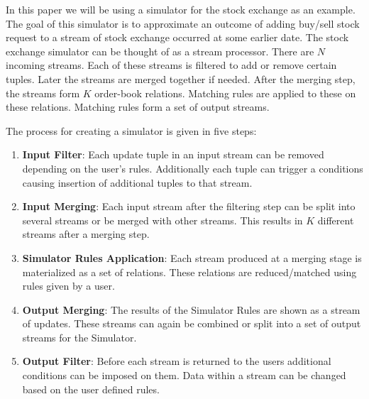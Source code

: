 \documentclass{article}
\begin{document}
In this paper we will be using a simulator for the stock exchange as an example. The goal of this simulator is to approximate an outcome of adding buy/sell stock request to a stream of stock exchange occurred at some earlier date. The stock exchange simulator can be thought of as a stream processor. There are $N$ incoming streams. Each of these streams is filtered to add or remove certain tuples. Later the streams are merged together if needed. After the merging step, the streams form $K$ order-book relations. Matching rules are applied to these on these relations. Matching rules form a set of output streams.

The process for creating a simulator is given in five steps:

\begin{enumerate}
    \item {\bf Input Filter}: Each update tuple in an input stream can be removed depending on the user's rules. Additionally each tuple can trigger a conditions causing insertion of additional tuples to that stream.  
    \item {\bf Input Merging}: Each input stream after the filtering step can be split into several streams or be merged with other streams. This results in $K$ different streams after a merging step.
    \item {\bf Simulator Rules Application}: Each stream produced at a merging stage is materialized as a set of relations. These relations are reduced/matched using rules given by a user.
    \item {\bf Output Merging}: The results of the Simulator Rules are shown as a stream of updates. These streams can again be combined or split into a set of output streams for the Simulator. 
    \item {\bf Output Filter}: Before each stream is returned to the users additional conditions can be imposed on them. Data within a stream can be changed based on the user defined rules.
\end{enumerate}
\end{document}
